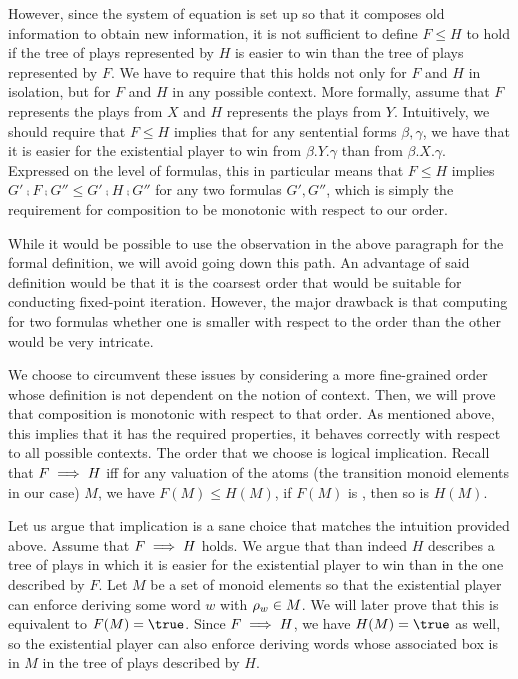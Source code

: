 \documentclass[../../diss.tex]{subfiles}
\begin{document}
However, since the system of equation is set up so that it composes old information to obtain new information, it is not sufficient to define $F \leq H$ to hold if the tree of plays represented by $H$ is easier to win than the tree of plays represented by $F$.
We have to require that this holds not only for $F$ and $H$ in isolation, but for $F$ and $H$ in any possible context.
More formally, assume that $F$ represents the plays from $X$ and $H$ represents the plays from $Y$.
Intuitively, we should require that $F \leq H$ implies that for any sentential forms $\beta,\gamma$, we have that it is easier for the existential player to win from $\beta.Y.\gamma$ than from $\beta.X.\gamma$.
Expressed on the level of formulas, this in particular means that $F \leq H$ implies $G' \comp F \comp G'' \leq G' \comp H \comp G''$ for any two formulas $G',G''$, which is simply the requirement for composition to be monotonic with respect to our order.

While it would be possible to use the observation in the above paragraph for the formal definition, we will avoid going down this path.
An advantage of said definition would be that it is the coarsest order that would be suitable for conducting fixed-point iteration.
However, the major drawback is that computing for two formulas whether one is smaller with respect to the order than the other would be very intricate.

We choose to circumvent these issues by considering a more fine-grained order whose definition is not dependent on the notion of context.
Then, we will prove that composition is monotonic with respect to that order.
As mentioned above, this implies that it has the required properties, \ie it behaves correctly with respect to all possible contexts.
The order that we choose is logical implication.
Recall that $F \implies H$ iff for any valuation of the atoms (the transition monoid elements in our case) $M$, we have $F(M) \leq H(M)$, \ie if $F(M)$ is \true, then so is $H(M)$.

Let us argue that implication is a sane choice that matches the intuition provided above.
Assume that $F \implies H$ holds.
We argue that than indeed $H$ describes a tree of plays in which it is easier for the existential player to win than in the one described by $F$.
Let $M$ be a set of monoid elements so that the existential player can enforce deriving some word $w$ with $\tbox{w} \in M$.
We will later prove that this is equivalent to $F(M) = \true$.
Since $F \implies H$, we have $H(M) = \true$ as well, so the existential player can also enforce deriving words whose associated box is in $M$ in the tree of plays described by $H$.
\end{document}
